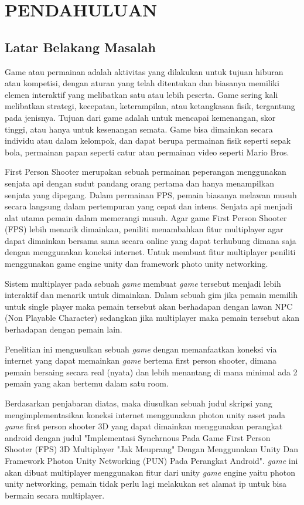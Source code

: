 \chapter{PENDAHULUAN}
\section{Latar Belakang Masalah}
\noindent

Game atau permainan adalah aktivitas yang dilakukan untuk tujuan hiburan atau kompetisi, dengan aturan yang telah ditentukan dan biasanya memiliki elemen interaktif yang melibatkan satu atau lebih peserta. Game sering kali melibatkan strategi, kecepatan, keterampilan, atau ketangkasan fisik, tergantung pada jenisnya. Tujuan dari game adalah untuk mencapai kemenangan, skor tinggi, atau hanya untuk kesenangan semata. Game bisa dimainkan secara individu atau dalam kelompok, dan dapat berupa permainan fisik seperti sepak bola, permainan papan seperti catur atau permainan video seperti Mario Bros.

First Person Shooter merupakan sebuah permainan peperangan menggunakan senjata api dengan sudut pandang orang pertama dan hanya menampilkan senjata yang dipegang.
Dalam permainan FPS, pemain biasanya melawan musuh secara langsung dalam pertempuran yang cepat dan intens. Senjata api menjadi alat utama pemain dalam memerangi musuh.
Agar game First Person Shooter (FPS) lebih menarik dimainkan, peniliti menambahkan fitur multiplayer agar dapat dimainkan bersama sama secara online yang dapat terhubung dimana saja dengan menggunakan koneksi internet. Untuk membuat fitur multiplayer peniliti menggunakan game engine unity dan framework photo unity networking.

Sistem multiplayer pada sebuah \textit{game} membuat \textit{game} tersebut menjadi lebih interaktif dan menarik untuk dimainkan. Dalam sebuah gim jika pemain memilih untuk single player maka pemain tersebut akan berhadapan dengan lawan NPC (Non Playable Character) sedangkan jika multiplayer maka pemain tersebut akan berhadapan dengan pemain lain.


Penelitian ini mengusulkan sebuah \textit{game} dengan memanfaatkan koneksi via internet yang dapat memainkan \textit{game} bertema first person shooter, dimana pemain bersaing secara real (nyata) dan lebih menantang di mana minimal ada 2 pemain yang akan bertemu dalam satu room.

Berdasarkan penjabaran diatas, maka diusulkan sebuah judul skripsi yang mengimplementasikan koneksi internet menggunakan photon unity asset pada \textit{game} first person shooter 3D yang dapat dimainkan menggunakan perangkat android dengan judul "Implementasi Synchrnous Pada Game First Person Shooter (FPS) 3D Multiplayer "Jak Meuprang" Dengan Menggunakan Unity Dan Framework Photon Unity Networking (PUN) Pada Perangkat Android".
\textit{game} ini akan dibuat multiplayer menggunakan fitur dari unity \textit{game} engine yaitu photon unity networking, pemain tidak perlu lagi melakukan set alamat ip untuk bisa bermain secara multiplayer.

